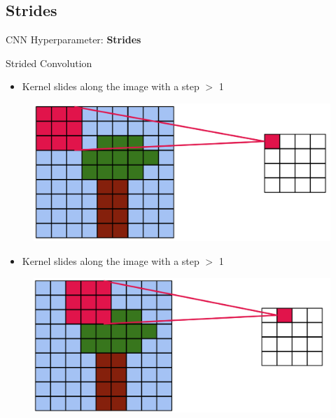 \subsection{Strides}
\begin{frame}{}
    \LARGE CNN Hyperparameter: \textbf{Strides}
\end{frame}

\begin{frame}[allowframebreaks]{Strided Convolution}

\begin{itemize}
    \item Kernel slides along the image with a step $>$ 1
\end{itemize}


\begin{figure}
\centering
\includegraphics[width=1.0\textwidth,height=0.8\textheight,keepaspectratio]{images/cnn/stride_1.png}
\end{figure}


\framebreak

\begin{itemize}
    \item Kernel slides along the image with a step $>$ 1
\end{itemize}


\begin{figure}
\centering
\includegraphics[width=1.0\textwidth,height=0.8\textheight,keepaspectratio]{images/cnn/stride_2.png}
\end{figure}
    
\end{frame}